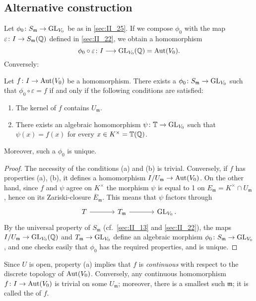 \subsection{Alternative construction}
\label{sec:II_26}
Let $\phi_0 \colon S_{\mathfrak{m}} \to \operatorname{GL}_{V_0}$ be as in \ref{sec:II_25}. If
we compose $\phi_0$ with the map $\varepsilon \colon I \to
S_{\mathfrak{m}}(\mathbb{Q})$ defined in \ref{sec:II_22}, we obtain a homomorphism
\[
	\phi_0 \circ \varepsilon \colon I \longrightarrow \operatorname{GL}_{V_0}(\mathbb{Q}) =
	\operatorname{Aut}(V_0).
\]
Conversely:
\dpage

\begin{prop}
Let $f \colon I \to \operatorname{Aut}(V_0)$ be a homomorphism. There exists a $\phi_0
\colon S_{\mathfrak{m}} \to \operatorname{GL}_{V_0}$ such that $\phi_0 \circ \varepsilon =
f$ if and only if the following conditions are satisfied:
\begin{enumerate}
	\item The kernel of $f$ contains $U_{\mathfrak{m}}$.
	\item There exists an algebraic homomorphism $\psi\colon \mathbb{T} \to
		\operatorname{GL}_{V_0}$ such that $\psi(x) = f(x)$ for every $x \in K^\times
		= \mathbb{T}(\mathbb{Q})$.
\end{enumerate}
Moreover, such a $\phi_0$ is unique.
\end{prop}
\begin{proof}
The necessity of the conditions (a) and (b) is trivial. 
Conversely, if $f$ has properties (a), (b), it defines a homomorphism
$I/U_{\mathfrak{m}} \to \operatorname{Aut}(V_0)$. On the other hand, since $f$ and $\psi$ agree on $K^\times$
the morphism $\psi$ is equal to 1 on $E_{\mathfrak{m}} = K^\times \cap U_{\mathfrak{m}}$, hence on its
Zariski-closure $\overline{E}_{\mathfrak{m}}$. This means that $\psi$ factors through
\[\begin{tikzcd}[sep=large]
	T \rar & T_{\mathfrak{m}} \rar & \GL_{V_0}.
\end{tikzcd}\]
By the universal property of $S_{\mathfrak{m}}$ (cf.\ \ref{sec:II_13} and
\ref{sec:II_22}), the maps $I/U_{\mathfrak{m}} \to \operatorname{GL}_{V_0}(\mathbb{Q})$ and
$T_{\mathfrak{m}} \to \operatorname{GL}_{V_0}$ define an algebraic morphism $\phi_0 \colon
S_{\mathfrak{m}} \to \operatorname{GL}_{V_0}$, and one checks easily that $\phi_0$ has the
required properties, and is unique.
\end{proof}

\begin{obs}
Since $U$ is open, property (a) implies that $f$ is \emph{continuous} with
\dpage
respect to the discrete topology of $\operatorname{Aut}(V_0)$. Conversely, any continuous
homomorphism $f\colon I \to \operatorname{Aut}(V_0)$ is trivial on some $U_{\mathfrak{m}}$;
moreover, there is a smallest such $\mathfrak{m}$; it is called the
 of $f$.
\end{obs}

